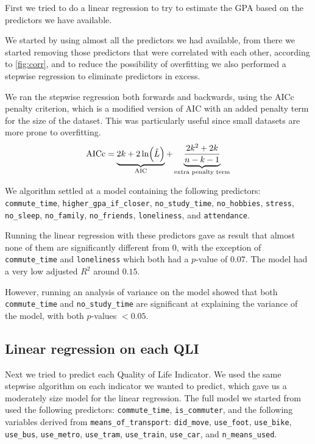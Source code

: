 \documentclass[11pt]{extarticle}
\numberwithin{table}{section}
\numberwithin{figure}{section}
\numberwithin{equation}{section}
\begin{document}
First we tried to do a linear regression to try to estimate the GPA
based on the predictors we have available.

We started by using almost all the predictors we had available,
from there we started removing those predictors that were correlated with each other,
according to \cref{fig:corr}, and to reduce the possibility of overfitting
we also performed a stepwise regression to eliminate predictors in excess.

We ran the stepwise regression both forwards and backwards,
using the AICc penalty criterion, which is a modified version of AIC with an added penalty term
for the size of the dataset.
This was particularly useful since small datasets are more prone to overfitting.
\begin{equation}
	{\operatorfont AICc} =
	\underbrace{2k + 2 \ln (\hat L)}_{\operatorfont AIC}
	+ \underbrace{\frac {2k^{2}+2k}{n-k-1}}_{\text{extra penalty term}}
\end{equation}

We algorithm settled at a model containing the following predictors:
\texttt{commute\_time},
\texttt{higher\_gpa\_if\_closer},
\texttt{no\_study\_time},
\texttt{no\_hobbies},
\texttt{stress},
\texttt{no\_sleep},
\texttt{no\_family},
\texttt{no\_friends},
\texttt{loneliness}, and
\texttt{attendance}.

Running the linear regression with these predictors gave as result that almost none of them
are significantly different from $0$, with the exception of
\texttt{commute\_time} and \texttt{loneliness} which both had a $p$-value of $0.07$.
The model had a very low adjusted $R^2$ around $0.15$.

However, running an analysis of variance on the model showed that both
\texttt{commute\_time} and \texttt{no\_study\_time} are significant
at explaining the variance of the model, with both $p$-values $<0.05$.

\subsection{Linear regression on each QLI}

Next we tried to predict each Quality of Life Indicator.
We used the same stepwise algorithm on each indicator we wanted to predict,
which gave us a moderately size model for the linear regression.
The full model we started from used the following predictors:
\texttt{commute\_time},
\texttt{is\_commuter}, and the following variables derived from \texttt{means\_of\_transport}:
\texttt{did\_move},
\texttt{use\_foot},
\texttt{use\_bike},
\texttt{use\_bus},
\texttt{use\_metro},
\texttt{use\_tram},
\texttt{use\_train},
\texttt{use\_car}, and
\texttt{n\_means\_used}.
\end{document}
